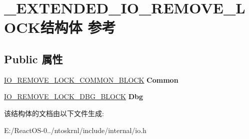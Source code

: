 \hypertarget{struct___e_x_t_e_n_d_e_d___i_o___r_e_m_o_v_e___l_o_c_k}{}\section{\+\_\+\+E\+X\+T\+E\+N\+D\+E\+D\+\_\+\+I\+O\+\_\+\+R\+E\+M\+O\+V\+E\+\_\+\+L\+O\+C\+K结构体 参考}
\label{struct___e_x_t_e_n_d_e_d___i_o___r_e_m_o_v_e___l_o_c_k}
\subsection*{Public 属性}
\begin{DoxyCompactItemize}
\item 
\mbox{\label{struct___e_x_t_e_n_d_e_d___i_o___r_e_m_o_v_e___l_o_c_k_ae991d51d21a01b613e8e5c1700818b88}} 
\hyperlink{struct___i_o___r_e_m_o_v_e___l_o_c_k___c_o_m_m_o_n___b_l_o_c_k}{I\+O\+\_\+\+R\+E\+M\+O\+V\+E\+\_\+\+L\+O\+C\+K\+\_\+\+C\+O\+M\+M\+O\+N\+\_\+\+B\+L\+O\+CK} {\bfseries Common}
\item 
\mbox{\label{struct___e_x_t_e_n_d_e_d___i_o___r_e_m_o_v_e___l_o_c_k_a50e68201374c48f28de9e71fdced7851}} 
\hyperlink{struct___i_o___r_e_m_o_v_e___l_o_c_k___d_b_g___b_l_o_c_k}{I\+O\+\_\+\+R\+E\+M\+O\+V\+E\+\_\+\+L\+O\+C\+K\+\_\+\+D\+B\+G\+\_\+\+B\+L\+O\+CK} {\bfseries Dbg}
\end{DoxyCompactItemize}


该结构体的文档由以下文件生成\+:\begin{DoxyCompactItemize}
\item 
E\+:/\+React\+O\+S-\/0../ntoskrnl/include/internal/io.\+h\end{DoxyCompactItemize}
